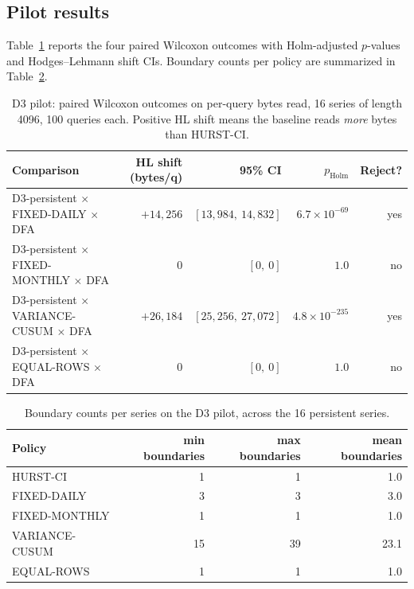 \documentclass[11pt]{article}
\begin{document}
\subsection{Pilot results}

Table~\ref{tab:pilot} reports the four paired Wilcoxon outcomes with Holm-adjusted $p$-values and Hodges--Lehmann shift CIs. Boundary counts per policy are summarized in Table~\ref{tab:boundaries}.

\begin{table}[ht]
\centering
\small
\begin{tabular}{lrrrr}
\toprule
Comparison & HL shift (bytes/q) & 95\% CI & $p_{\mathrm{Holm}}$ & Reject? \\
\midrule
D3-persistent $\times$ FIXED-DAILY $\times$ DFA   & $+14{,}256$ & $[13{,}984,\ 14{,}832]$  & $6.7\!\times\!10^{-69}$  & yes \\
D3-persistent $\times$ FIXED-MONTHLY $\times$ DFA & $0$          & $[0,\ 0]$                  & $1.0$                    & no  \\
D3-persistent $\times$ VARIANCE-CUSUM $\times$ DFA & $+26{,}184$ & $[25{,}256,\ 27{,}072]$  & $4.8\!\times\!10^{-235}$ & yes \\
D3-persistent $\times$ EQUAL-ROWS $\times$ DFA    & $0$          & $[0,\ 0]$                  & $1.0$                    & no  \\
\bottomrule
\end{tabular}
\caption{D3 pilot: paired Wilcoxon outcomes on per-query bytes read, 16 series of length 4096, 100 queries each. Positive HL shift means the baseline reads \emph{more} bytes than HURST-CI.}
\label{tab:pilot}
\end{table}

\begin{table}[ht]
\centering
\small
\begin{tabular}{lrrr}
\toprule
Policy & min boundaries & max boundaries & mean boundaries \\
\midrule
HURST-CI       & 1  & 1   & 1.0 \\
FIXED-DAILY    & 3  & 3   & 3.0 \\
FIXED-MONTHLY  & 1  & 1   & 1.0 \\
VARIANCE-CUSUM & 15 & 39  & 23.1 \\
EQUAL-ROWS     & 1  & 1   & 1.0 \\
\bottomrule
\end{tabular}
\caption{Boundary counts per series on the D3 pilot, across the 16 persistent series.}
\label{tab:boundaries}
\end{table}
\end{document}
